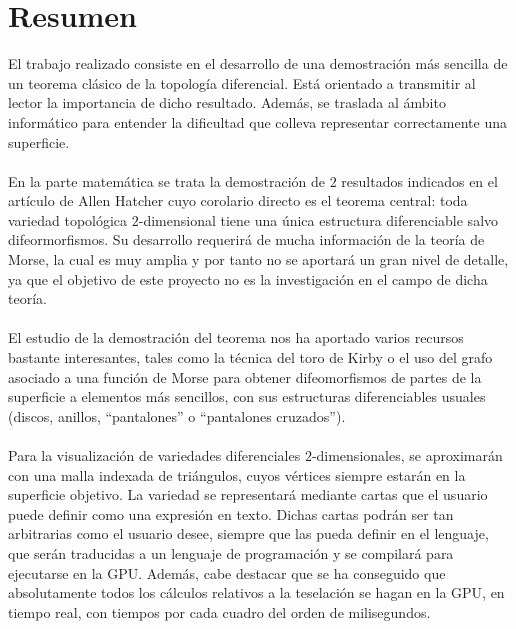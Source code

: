 %

\chapter{Resumen}
El trabajo realizado consiste en el desarrollo de una demostración más sencilla de un teorema clásico de la topología diferencial. Está orientado a transmitir al lector la importancia de dicho resultado. Además, se traslada al ámbito informático para entender la dificultad que colleva representar correctamente una superficie.\\
\\En la parte matemática se trata la demostración de $2$ resultados indicados en el artículo de Allen Hatcher \cite{arXiv:1312.3518} cuyo corolario directo es el teorema central: toda variedad topológica $2$-dimensional tiene una única estructura diferenciable salvo difeormorfismos. Su desarrollo requerirá de mucha información de la teoría de Morse, la cual es muy amplia y por tanto no se aportará un gran nivel de detalle, ya que el objetivo de este proyecto no es la investigación en el campo de dicha teoría.\\
\\El estudio de la demostración del teorema nos ha aportado varios recursos bastante interesantes, tales como la técnica del toro de Kirby o el uso del grafo asociado a una función de Morse para obtener difeomorfismos de partes de la superficie a elementos más sencillos, con sus estructuras diferenciables usuales (discos, anillos, ``pantalones'' o ``pantalones cruzados'').\\
\\Para la visualización de variedades diferenciales $2$-dimensionales, se aproximarán con una malla indexada de triángulos, cuyos vértices siempre estarán en la superficie objetivo. La variedad se representará mediante cartas que el usuario puede definir como una expresión en texto. Dichas cartas podrán ser tan arbitrarias como el usuario desee, siempre que las pueda definir en el lenguaje, que serán traducidas a un lenguaje de programación y se compilará para ejecutarse en la GPU. Además, cabe destacar que se ha conseguido que absolutamente todos los cálculos relativos a la teselación se hagan en la GPU, en tiempo real, con tiempos por cada cuadro del orden de milisegundos.\\

